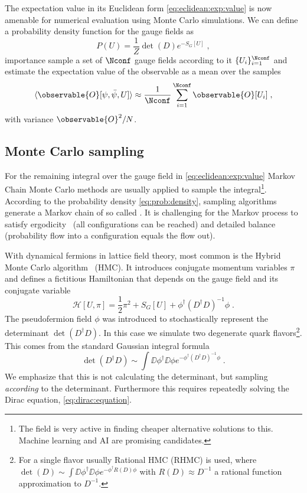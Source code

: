 The expectation value in its Euclidean form \cref{eq:eclidean:exp:value} is now amenable for numerical evaluation using Monte Carlo simulations.
We can define a probability density function for the gauge fields as
\begin{equation} \label{eq:prob:density}
P(U) = \frac{1}{Z} \det(D) e^{- S_G[U]} \;,
\end{equation}
importance sample a set of $\Nconf$ gauge fields according to it $\{U_i\}_{i=1}^{\Nconf}$ and estimate the expectation value of the observable as a mean over the samples
\begin{equation}
\langle \observable{O}[\psi, \bar{\psi}, U] \rangle \approx \frac{1}{\Nconf} \sum_{i=1}^{\Nconf} \observable{O}[U_i] \;,
\end{equation}
with variance $\observable{O}^{2} / N$.


\subsection{Monte Carlo sampling}


For the remaining integral over the gauge field in \cref{eq:eclidean:exp:value} Markov Chain Monte Carlo methods are usually applied to sample the integral\footnote{The field is very active in finding cheaper alternative solutions to this. Machine learning and AI are promising candidates.}.
According to the probability density \cref{eq:prob:density}, sampling algorithms generate a Markov chain of so called .
It is challenging for the Markov process to satisfy ergodicity~\cite{10.1063/5.0004106,PhysRevLett.60.1243} (all configurations can be reached) and detailed balance (probability flow into a configuration equals the flow out).

With dynamical fermions in lattice field theory, most common is the Hybrid Monte Carlo algorithm~\cite{DUANE1987216} (HMC).
It introduces conjugate momentum variables $\pi$ and defines a fictitious Hamiltonian that depends on the gauge field and its conjugate variable
\begin{equation}
\mathcal{H}[U, \pi] = \frac{1}{2} \pi^{2} + S_{G}[U] + \phi^{\dagger} (D^{\dagger} D)^{-1} \phi \;.
\end{equation}
The pseudofermion field $\phi$ was introduced to stochastically represent the determinant $\det(D^{\dagger} D)$.
In this case we simulate two degenerate quark flavors\footnote{For a single flavor usually Rational HMC (RHMC) is used, where $\det(D) \sim \int \DD \phi^{\dagger} \DD \phi e^{-\phi^{\dagger} R(D) \phi}$ with $R(D) \approx D^{-1}$ a rational function approximation to $D^{-1}$.}.
This comes from the standard Gaussian integral formula
\begin{equation}
\det(D^{\dagger} D) \sim \int \DD \phi^{\dagger} \DD \phi e^{- \phi^{\dagger} ( D^{\dagger} D )^{-1} \phi} \;.
\end{equation}
We emphasize that this is not calculating the determinant, but sampling \emph{according} to the determinant.
Furthermore this requires repeatedly solving the Dirac equation, \cref{eq:dirac:equation}.

